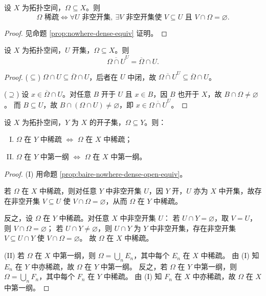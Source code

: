\documentclass[lang=cn,a4paper,newtx,figureplace=section,tableplace=section]{elegantbook}
\begin{document}
\begin{proposition}\label{prop:baire-nowhere-dense-open-equiv}
  设 $X$ 为拓扑空间，$\Omega\subseteq X$。则
  \[
    \Omega\text{ 稀疏}\Leftrightarrow\forall U\text{ 非空开集},\ \exists V\text{ 非空开集使 }V\subseteq U\text{ 且 }V\cap\Omega=\varnothing.
  \]
\end{proposition}
\begin{proof}
  见命题 \ref{prop:nowhere-dense-equiv} 证明。
\end{proof}

\begin{proposition}\label{prop:dense-in-open-subspace}
  设 $X$ 为拓扑空间，$U$ 开集，$\Omega\subseteq X$。则
  \[
    \overline{\Omega\cap U}^U=\overline\Omega\cap U.
  \]
\end{proposition}
\begin{proof}
  ($\subseteq$) $\Omega\cap U\subseteq\overline\Omega\cap U$，后者在 $U$ 中闭，故 $\overline{\Omega\cap U}^U\subseteq\overline\Omega\cap U$。

  ($\supseteq$) 设 $x\in\overline\Omega\cap U$。对任意 $B$ 开于 $U$ 且 $x\in B$，因 $B$ 也开于 $X$，故 $B\cap\Omega\neq\varnothing$。
  而 $B\subseteq U$，故 $B\cap(\Omega\cap U)\neq\varnothing$，即 $x\in\overline{\Omega\cap U}^U$。
\end{proof}

\begin{lemma}\label{lem:category-in-open-subspace}
  设 $X$ 为拓扑空间，$Y$ 为 $X$ 的开子集，$\Omega\subseteq Y$。则：
  \begin{enumerate}[(I)]
    \item $\Omega$ 在 $Y$ 中稀疏 $\Leftrightarrow$ $\Omega$ 在 $X$ 中稀疏；
    \item $\Omega$ 在 $Y$ 中第一纲 $\Leftrightarrow$ $\Omega$ 在 $X$ 中第一纲。
  \end{enumerate}
\end{lemma}
\begin{proof}
  (I) 用命题 \ref{prop:baire-nowhere-dense-open-equiv}。
  
  若 $\Omega$ 在 $X$ 中稀疏，则对任意 $Y$ 中非空开集 $U$，因 $Y$ 开，$U$ 亦为 $X$ 中开集，故存在非空开集 $V\subseteq U$ 使 $V\cap\Omega=\varnothing$，从而 $\Omega$ 在 $Y$ 中稀疏。

  反之，设 $\Omega$ 在 $Y$ 中稀疏。对任意 $X$ 中非空开集 $U$：
  若 $U\cap Y=\varnothing$，取 $V=U$，则 $V\cap\Omega=\varnothing$；
  若 $U\cap Y\neq\varnothing$，则 $U\cap Y$ 为 $Y$ 中非空开集，存在非空开集 $V\subseteq U\cap Y$ 使 $V\cap\Omega=\varnothing$。
  故 $\Omega$ 在 $X$ 中稀疏。

  (II) 若 $\Omega$ 在 $X$ 中第一纲，则 $\Omega=\bigcup_n E_n$，其中每个 $E_n$ 在 $X$ 中稀疏。
  由 (I) 知 $E_n$ 在 $Y$ 中亦稀疏，故 $\Omega$ 在 $Y$ 中第一纲。
  反之，若 $\Omega$ 在 $Y$ 中第一纲，则 $\Omega=\bigcup_n F_n$，其中每个 $F_n$ 在 $Y$ 中稀疏。
  由 (I) 知 $F_n$ 在 $X$ 中亦稀疏，故 $\Omega$ 在 $X$ 中第一纲。
\end{proof}
\end{document}
